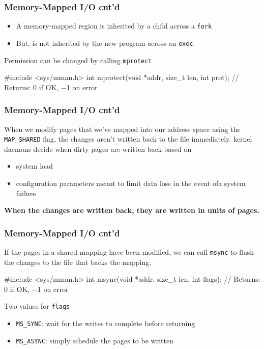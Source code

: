 \documentclass[newPxFont,sthlmFooter,nooffset]{beamer}
\begin{document}
\begin{frame}[t, fragile]
  \frametitle{Memory-Mapped I/O cnt'd}
 
  \begin{itemize}
  \item A memory-mapped region is inherited by a child across a \texttt{fork}
  \item But, is not inherited by the new program across an \texttt{exec}.
  \end{itemize}
\bigskip

Permission can be changed by calling \texttt{mprotect}
\begin{codedef}
#include <sys/mman.h>
int mprotect(void *addr, size_t len, int prot);
// Returns: 0 if OK, −1 on error
\end{codedef}

\end{frame}


\begin{frame}[t, fragile]
  \frametitle{Memory-Mapped I/O cnt'd}
When we modify pages that we’ve mapped into our address space using the \texttt{MAP\_SHARED} flag, the changes aren’t written back to the file immediately. 
\bigskip
kernel daemons decide when dirty pages are written back based on
\begin{itemize}
\item system load
\item configuration parameters meant to limit data loss in the event ofa system failure
\end{itemize}
\textbf{When the changes are written back, they are written in units of pages. }

\end{frame}


\begin{frame}[t, fragile]
  \frametitle{Memory-Mapped I/O cnt'd}
If the pages in a shared mapping have been modified, we can call \texttt{msync} to flush the changes to the file that backs the mapping. 
\begin{codedef}
#include <sys/mman.h>
int msync(void *addr, size_t len, int flags);
// Returns: 0 if OK, −1 on error  
\end{codedef}

Two values for \texttt{flags}
\begin{itemize}
\item \texttt{MS\_SYNC}: wait for the writes to complete before returning
\item \texttt{MS\_ASYNC}: simply schedule the pages to be written
\end{itemize}

\end{frame}
\end{document}
